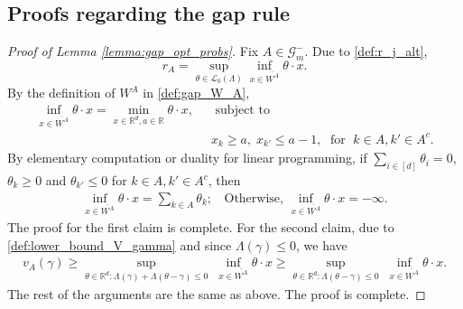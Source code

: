 \documentclass[aap,preprint]{imsart}
\newcommand{\Mstar}{[m]}
\newcommand{\bR}{{\mathbb{R}}}
\theoremstyle{plain}
\theoremstyle{definition}
\begin{document}
\begin{appendix}
\section{Proofs regarding the gap rule}\label{app:gap_rule}

\begin{proof}[Proof of Lemma \ref{lemma:gap_opt_probs}]
Fix $ A \in \mathcal{G}_m^{-}$. Due to \eqref{def:r_j_alt},
$$
r_A =  \sup_{\theta \in \mathcal{L}_0(\Lambda)} \inf_{x \in \overline{W^A}}  \theta \cdot x.
$$
By the definition of $W^A$ in \eqref{def:gap_W_A}, 
\begin{align*}
   \inf_{x \in \overline{W^A}}  \theta \cdot x =   \min_{x \in \bR^d, a \in \bR} \theta \cdot x, \;\;&\text{ subject to} \\
   & x_{k} \geq a,\; x_{k'} \leq a-1,\; \text{ for } \;k  \in A, k'\in A^c.
\end{align*}
By elementary computation or duality for linear programming, if $\sum_{i \in [d]}\theta_i = 0$, $\theta_k \geq 0$ and $\theta_{k'} \leq 0$ for $k \in A, k' \in A^c$, then
    \begin{align*}
   \inf_{x \in \overline{W^A}}  \theta \cdot x =   \sum_{k \in A} \theta_k;\;\; \text{ Otherwise, } \inf_{x \in \overline{W^A}}  \theta \cdot x = -\infty.
\end{align*}
The proof for the first claim is complete. For the second claim, due to \eqref{def:lower_bound_V_gamma} and since $\Lambda(\gamma) \leq  0$, we have
\begin{align*}
v_A(\gamma)  
\geq  
\sup_{\theta \in \bR^d: \Lambda(\gamma) + \Lambda(\theta-\gamma) \leq 0}\; \inf_{x \in \overline{W^A}} \theta \cdot x \geq 
\sup_{\theta \in \bR^d:  \Lambda(\theta-\gamma) \leq 0} \;\inf_{x \in \overline{W^A}} \theta \cdot x.
\end{align*}
The rest of the arguments are the same as above. The proof is complete.
\end{proof}

\end{appendix}
\end{document}
